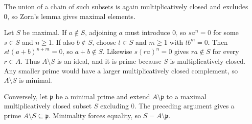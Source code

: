 The union of a chain of such subsets is again multiplicatively closed and excludes $0$, so Zorn's lemma gives maximal elements.

Let $S$ be maximal. If $a\notin S$, adjoining $a$ must introduce $0$, so $sa^n=0$ for some $s\in S$ and $n\ge1$. If also $b\notin S$, choose $t\in S$ and $m\ge1$ with $tb^m=0$. Then $st(a+b)^{n+m}=0$, so $a+b\notin S$. Likewise $s(ra)^n=0$ gives $ra\notin S$ for every $r\in A$. Thus $A\setminus S$ is an ideal, and it is prime because $S$ is multiplicatively closed. Any smaller prime would have a larger multiplicatively closed complement, so $A\setminus S$ is minimal.

Conversely, let $\mathfrak p$ be a minimal prime and extend $A\setminus\mathfrak p$ to a maximal multiplicatively closed subset $S$ excluding $0$. The preceding argument gives a prime $A\setminus S\subseteq\mathfrak p$. Minimality forces equality, so $S=A\setminus\mathfrak p$.
